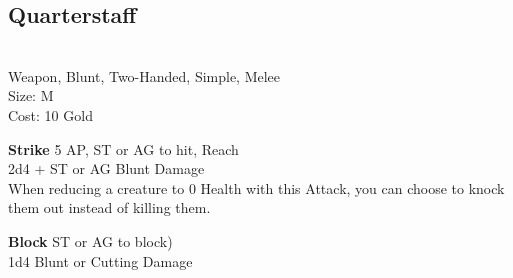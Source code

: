 \subsection{Quarterstaff}\label{weapon:quarterstaff}\\
Weapon, Blunt, Two-Handed, Simple, Melee\\
Size: M\\
Cost: 10 Gold

\textbf{Strike}
5 AP, ST or AG to hit,  Reach\\
2d4 + \texttimes ST or AG Blunt Damage\\
When reducing a creature to 0 Health with this Attack, you can choose to knock them out instead of killing them.

\textbf{Block}
ST or AG to block)\\
1d4 Blunt or Cutting Damage

